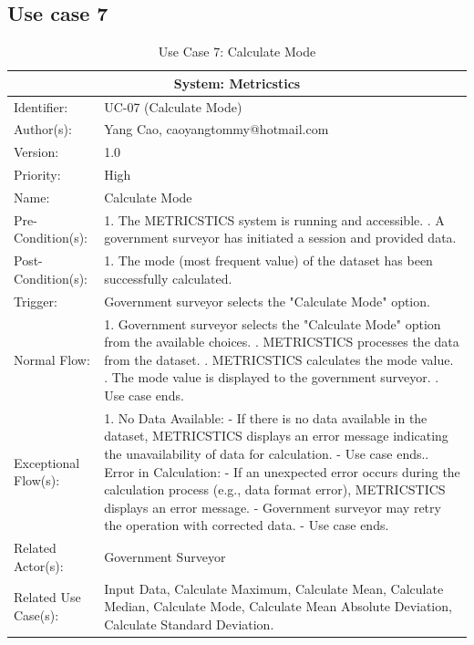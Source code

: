 
\begin{table}[h]
\subsection*{Use case 7}
\begin{tabular}{ | p{4cm} | p{10cm} | }
 \hline
 \multicolumn{2}{|c|}{System: Metricstics} \\
 \hline
 Identifier: & UC-07 (Calculate Mode)  \\
 \hline
 Author(s): & Yang Cao, caoyangtommy@hotmail.com    \\
 \hline
 Version: & 1.0	\\
 \hline
 Priority: & High	\\
 \hline
 Name: & Calculate Mode  \\
 \hline
 Pre-Condition(s):  & {1. The METRICSTICS system is running and accessible. \newline 2. A government surveyor has initiated a session and provided data.  }\\
 \hline
 Post-Condition(s):  & {1. The mode (most frequent value) of the dataset has been successfully calculated. }\\
 \hline
 Trigger: & Government surveyor selects the "Calculate Mode" option.   \\
 \hline
 Normal Flow:  & {1. Government surveyor selects the "Calculate Mode" option from the available choices. \newline 2. METRICSTICS processes the data from the dataset. \newline 3. METRICSTICS calculates the mode value. \newline 4. The mode value is displayed to the government surveyor. \newline5. Use case ends.}\\
 \hline
 Exceptional Flow(s):  & {1. No Data Available: \newline
   - If there is no data available in the dataset, METRICSTICS displays an error message indicating the unavailability of data for calculation.\newline
   - Use case ends.\newline
   2. Error in Calculation: \newline
   - If an unexpected error occurs during the calculation process (e.g., data format error), METRICSTICS displays an error message. \newline
   - Government surveyor may retry the operation with corrected data. \newline
   - Use case ends.}\\
 \hline
 Related Actor(s): & Government Surveyor\\
 \hline
 Related Use Case(s): & Input Data, Calculate Maximum, Calculate Mean, Calculate Median, Calculate Mode, Calculate Mean Absolute Deviation, Calculate Standard Deviation.\\
 \hline
 \end{tabular}
\renewcommand{\thetable}{\arabic{table}}
\caption{Use Case 7: Calculate Mode}
\label{tab:table1}
\end{table}

